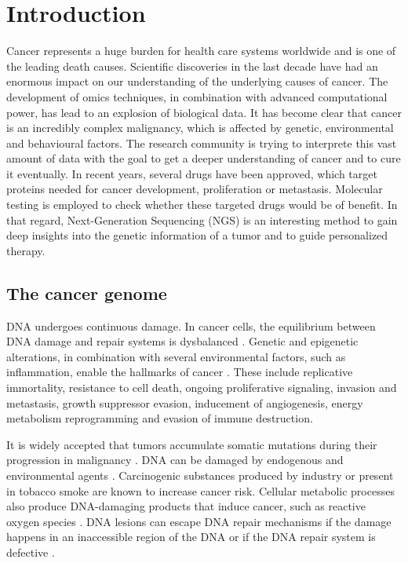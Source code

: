 \section{Introduction}

  Cancer represents a huge burden for health care systems worldwide and is one
  of the leading death causes. Scientific discoveries in the last decade have
  had an enormous impact on our understanding of the underlying causes of
  cancer. The development of omics techniques, in combination with advanced
  computational power, has lead to an explosion of biological data. It has
  become clear that cancer is an incredibly complex malignancy, which is
  affected by genetic, environmental and behavioural factors. The research
  community is trying to interprete this vast amount of data with the goal to
  get a deeper understanding of cancer and to cure it eventually. In recent
  years, several drugs have been approved, which target proteins needed for
  cancer development, proliferation or metastasis. Molecular testing is employed
  to check whether these targeted drugs would be of benefit. In that regard,
  Next-Generation Sequencing (NGS) is an interesting method to gain deep
  insights into the genetic information of a tumor and to guide personalized
  therapy.

  \subsection{The cancer genome}

    DNA undergoes continuous damage. In cancer cells, the equilibrium
    between DNA damage and repair systems is dysbalanced
    {\cite{dna_repair_epidemioloy}}. Genetic and epigenetic alterations, in
    combination with several environmental factors, such as inflammation, enable
    the hallmarks of cancer {\cite{cancer_hallmarks}}. These include replicative
    immortality, resistance to cell death, ongoing proliferative signaling,
    invasion and metastasis, growth suppressor evasion, inducement of
    angiogenesis, energy metabolism reprogramming and evasion of immune
    destruction.

    It is widely accepted that tumors accumulate somatic mutations during their
    progression in malignancy {\cite{accumulation_rates}}
    {\cite{mutations_counting}}. DNA can be damaged by endogenous and
    environmental agents {\cite{multiple_mutations}}. Carcinogenic substances
    produced by industry {\cite{occupational_exposure}} {\cite{rubber_industry}}
    or present in tobacco smoke {\cite{smoking_cancer}} are known to increase
    cancer risk. Cellular metabolic processes also produce DNA-damaging products
    that induce cancer, such as reactive oxygen species {\cite{ros_cancer}}
    {\cite{ros_cancer_other}}. DNA lesions can escape DNA repair mechanisms if
    the damage happens in an inaccessible region of the DNA or if the DNA repair
    system is defective {\cite{dna_repair}}.

